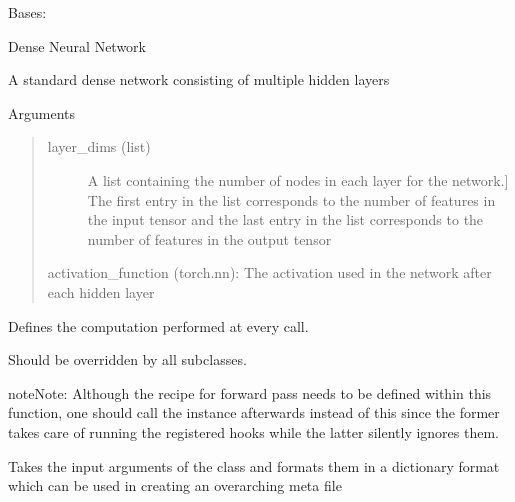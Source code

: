 \documentclass[letterpaper,10pt,english]{sphinxmanual}
\begin{document}
\begin{fulllineitems}
\label{\detokenize{modules/gqcml.nn:gqcml.nn.models.DNN}}
Bases: 

Dense Neural Network

A standard dense network consisting of multiple hidden layers

Arguments
\begin{quote}
\begin{description}
\item[{layer\_dims (list)}] \leavevmode{[}A list containing the number of nodes in each layer for the network.{]}
The first entry in the list corresponds to the number of features in the input tensor
and the last entry in the list corresponds to the number of features in the output tensor

\end{description}

activation\_function (torch.nn): The activation used in the network after each hidden layer
\end{quote}

\begin{fulllineitems}
\label{\detokenize{modules/gqcml.nn:gqcml.nn.models.DNN.forward}}
Defines the computation performed at every call.

Should be overridden by all subclasses.

\begin{sphinxadmonition}{note}{Note:}
Although the recipe for forward pass needs to be defined within
this function, one should call the  instance afterwards
instead of this since the former takes care of running the
registered hooks while the latter silently ignores them.
\end{sphinxadmonition}

\end{fulllineitems}


\begin{fulllineitems}
\label{\detokenize{modules/gqcml.nn:gqcml.nn.models.DNN.meta}}
Takes the input arguments of the class and formats them in a dictionary format which can be used in
creating an overarching meta file

\end{fulllineitems}


\end{fulllineitems}
\end{document}
